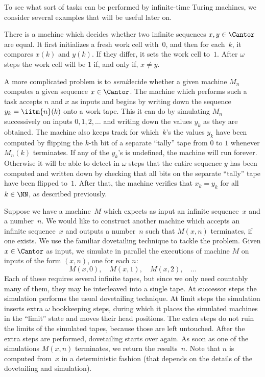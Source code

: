 To see what sort of tasks can be performed by infinite-time Turing machines, we consider
several examples that will be useful later on.

\begin{example}
  There is a machine which decides whether two infinite sequences $x, y \in
  \Cantor$ are equal. It first initializes a fresh work cell with~$0$, and then
  for each~$k$, it compares $x(k)$ and $y(k)$. If they differ, it sets the work cell to~$1$. After $\omega$ steps the work cell will be $1$ if, and only if, $x \neq y$.
\end{example}

\begin{example}
  A more complicated problem is to \emph{semi}decide whether a given machine $M_n$ computes
  a given sequence $x \in \Cantor$. The machine which performs such a task accepts $n$ and $x$ as inputs and begins by writing down the sequence $y_k = \iitm{n}(k)$ onto a work tape. This it can do by simulating $M_n$ successively on inputs $0, 1, 2, \ldots$ and writing down the values $y_k$ as they are obtained. The machine also keeps track for which~$k$'s the values $y_k$ have been computed by flipping the $k$-th bit of a separate ``tally'' tape from $0$ to $1$ whenever $M_n(k)$ terminates. If any of the $y_k$'s is undefined, the machine will run forever. Otherwise it will be able to detect in $\omega$ steps that the entire sequence $y$ has been computed and written down by checking that all bits on the separate ``tally'' tape have been flipped to~$1$. After that, the machine verifies that $x_k = y_k$ for all $k \in \NN$, as described previously.
\end{example}

\begin{example}
  Suppose we have a machine~$M$ which expects as input an infinite sequence~$x$ and a
  number~$n$. We would like to construct another machine which accepts an infinite
  sequence~$x$ and outputs a number~$n$ such that $M(x,n)$ terminates, if one exists.
  We use the familiar dovetailing technique to tackle the problem. Given $x \in \Cantor$ as input, we simulate in parallel the executions of machine $M$ on inputs of the form $(x,n)$, one
  for each $n$:
  \begin{equation*}
    M(x,0), \quad
    M(x,1), \quad
    M(x,2), \quad
    \ldots
  \end{equation*}
  Each of these requires several infinite tapes, but since we only need countably
  many of them, they may be interleaved into a single tape. At successor steps the
  simulation performs the usual dovetailing technique. At limit steps the
  simulation inserts extra $\omega$ bookkeeping steps, during which it places the
  simulated machines in the ``limit'' state and moves their head positions. The
  extra steps do not ruin the limits of the simulated tapes, because those are
  left untouched. After the extra steps are performed, dovetailing starts over
  again. As soon as one of the simulations $M(x, n)$ terminates, we return the
  results~$n$. Note that $n$ is computed from~$x$ in a deterministic fashion (that depends on the details of the dovetailing and simulation).
\end{example}

